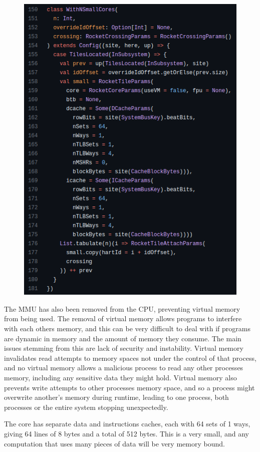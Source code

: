 \begin{figure}
    \includegraphics[]{./img/rocketcore_default_small.png}
\end{figure}

The MMU has also been removed from the CPU, preventing virtual memory from being used. The removal of virtual memory allows programs to interfere with each others memory, and this can be very difficult to deal with if programs are dynamic in memory and the amount of memory they consume. The main issues stemming from this are lack of security and instability. Virtual memory invalidates read attempts to memory spaces not under the control of that process, and no virtual memory allows a malicious process to read any other processes memory, including any sensitive data they might hold. Virtual memory also prevents write attempts to other processes memory space, and so a process might overwrite another's memory during runtime, leading to one process, both processes or the entire system stopping unexpectedly.

The core has separate data and instructions caches, each with 64 sets of 1 ways, giving 64 lines of 8 bytes and a total of 512 bytes. This is a very small, and any computation that uses many pieces of data will be very memory bound.

